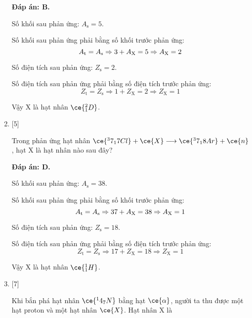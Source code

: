 \begin{enumerate}[label=\bfseries Câu \arabic*:]
	\loigiai
	{		\textbf{Đáp án: B.}
		
		Số khối sau phản ứng: $A_\text{s} = 5$.
		
		Số khối sau phản ứng phải bằng số khối trước phản ứng:
		$$A_\text{t} = A_\text{s} \Rightarrow 3+A_\text X = 5 \Rightarrow A_\text X = 2$$
		
		Số điện tích sau phản ứng: $Z_\text{s} = 2$.
		
		Số điện tích sau phản ứng phải bằng số điện tích trước phản ứng:
		$$Z_\text{t} = Z_\text{s} \Rightarrow 1 + Z_\text{X} = 2 \Rightarrow Z_\text{X} = 1$$
		
		Vậy X là hạt nhân $\ce{^2_1 D}$.
		
	}
	\item {} [5]
	\cauhoi
	{Trong phản ứng hạt nhân $\ce{^37_17 Cl} + \ce{X} \longrightarrow \ce{^37_18 Ar} + \ce{n}$, hạt X là hạt nhân nào sau đây?
	}
	
	\loigiai
	{		\textbf{Đáp án: D.}
		
		Số khối sau phản ứng: $A_\text{s} = 38$.
		
		Số khối sau phản ứng phải bằng số khối trước phản ứng:
		$$A_\text{t} = A_\text{s} \Rightarrow 37+A_\text X = 38 \Rightarrow A_\text X = 1$$
		
		Số điện tích sau phản ứng: $Z_\text{s} = 18$.
		
		Số điện tích sau phản ứng phải bằng số điện tích trước phản ứng:
		$$Z_\text{t} = Z_\text{s} \Rightarrow 17 + Z_\text{X} = 18 \Rightarrow Z_\text{X} = 1$$
		
		Vậy X là hạt nhân $\ce{^1_1 H}$.
		
	}
	\item {} [7]
	\cauhoi
	{Khi bắn phá hạt nhân $\ce{^14_7 N}$ bằng hạt $\ce{\alpha}$, người ta thu được một hạt proton và một hạt nhân $\ce{X}$. Hạt nhân X là
	}
	

\end{enumerate}
